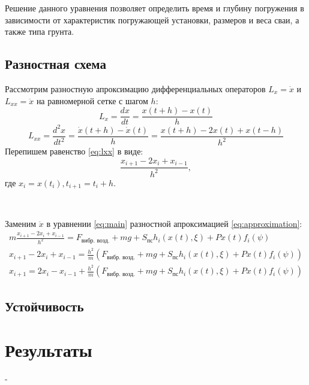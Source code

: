 Решение данного уравнения позволяет определить время и глубину погружения в зависимости от характеристик погружающей
установки, размеров и веса сваи, а также типа грунта.

\subsection{Разностная схема}

Рассмотрим разностную апроксимацию дифференциальных операторов $L_x = \dot{x}$ и $L_{xx} = \ddot{x}$ на равномерной
сетке с шагом $h$:
\begin{equation}
    L_x = \frac{dx}{dt} = \frac{x(t + h) - x(t)}{h}
\end{equation}
\begin{equation}
    \label{eq:lxx}
    L_{xx} = \frac{d^2x}{dt^2} = \frac{\dot{x}(t + h) - \dot{x}(t)}{h} = \frac{x(t + h) - 2x(t) + x(t - h)}{h^2}
\end{equation}
Перепишем равенство \ref{eq:lxx} в виде:
\begin{equation}
    \label{eq:approximation}
    \frac{x_{i+1} - 2x_i + x_{i-1}}{h^2},
\end{equation}
где $x_i = x(t_i), t_{i+1} = t_i + h$.

~\

\noindent Заменим $\ddot{x}$ в уравнении \ref{eq:main} разностной апроксимацией \ref{eq:approximation}:
\begin{equation}
    \begin{aligned}
        m\frac{x_{i+1} - 2x_i + x_{i-1}}{h^2} = F_\text{вибр. возд.} + mg + S_\text{пс} h_i(x(t), \xi)+ P x(t) f_i(\psi)\\
        x_{i+1} - 2x_i + x_{i-1} = \frac{h^2}{m}(F_\text{вибр. возд.} + mg + S_\text{пс} h_i(x(t), \xi) + P x(t) f_i(\psi))\\
        x_{i+1} = 2x_i - x_{i-1} + \frac{h^2}{m}(F_\text{вибр. возд.} + mg + S_\text{пс} h_i(x(t), \xi) + P x(t) f_i(\psi))
    \end{aligned}
\end{equation}

\subsection{Устойчивость}

\clearpage

\section{Результаты}

\clearpage


\begin{thebibliography}{}
     -
\end{thebibliography}